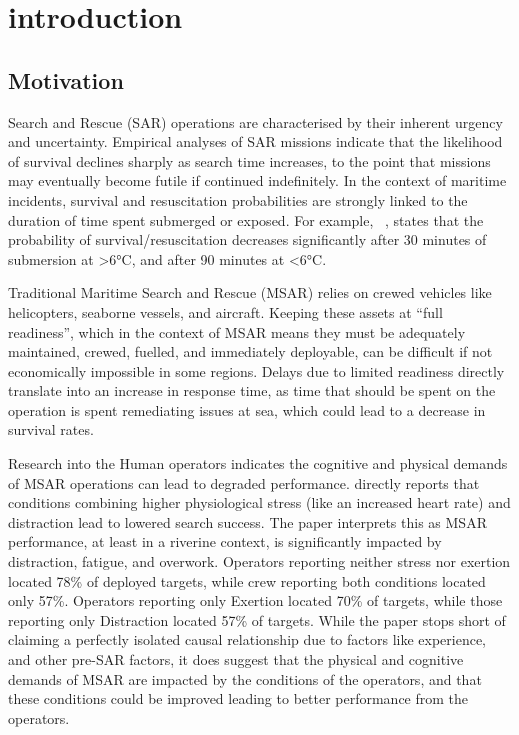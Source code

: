 \section{introduction}\label{sec:introduction}

\subsection{Motivation}\label{subsec:motivation}

Search and Rescue (SAR) operations are characterised by their inherent urgency and uncertainty.
Empirical analyses of SAR missions indicate that the likelihood of survival declines sharply as search time increases, to the point that missions may eventually become futile if continued indefinitely.
In the context of maritime incidents, survival and resuscitation probabilities are strongly linked to the duration of time spent submerged or exposed.
For example, ~\cite{RN2}, states that the probability of survival/resuscitation decreases significantly after 30 minutes of submersion at >6°C, and after 90 minutes at <6°C\@.

Traditional Maritime Search and Rescue (MSAR) relies on crewed vehicles like helicopters, seaborne vessels, and aircraft.
Keeping these assets at ``full readiness'', which in the context of MSAR means they must be adequately maintained, crewed, fuelled, and immediately deployable, can be difficult if not economically impossible in some regions.
Delays due to limited readiness directly translate into an increase in response time, as time that should be spent on the operation is spent remediating issues at sea, which could lead to a decrease in survival rates.

Research into the Human operators indicates the cognitive and physical demands of MSAR operations can lead to degraded performance.
\cite{riverine_MSAR_stress} directly reports that conditions combining higher physiological stress (like an increased heart rate) and distraction lead to lowered search success.
The paper interprets this as MSAR performance, at least in a riverine context, is significantly impacted by distraction, fatigue, and overwork.
Operators reporting neither stress nor exertion located 78\% of deployed targets, while crew reporting both conditions located only 57\%.
Operators reporting only Exertion located 70\% of targets, while those reporting only Distraction located 57\% of targets.
While the paper stops short of claiming a perfectly isolated causal relationship due to factors like experience, and other pre-SAR factors, it does suggest that the physical and cognitive demands of MSAR are impacted by the conditions of the operators, and that these conditions could be improved leading to better performance from the operators.


